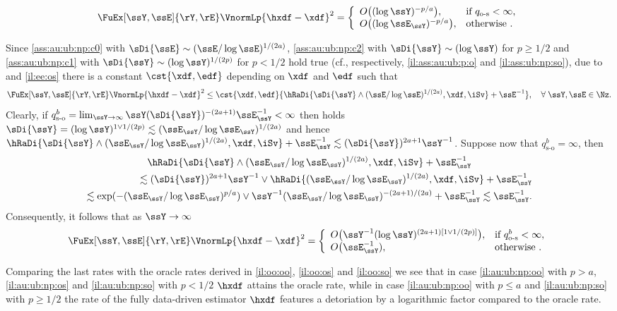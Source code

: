 \begin{il}
\begin{Liste}[]
\begin{equation*}
\FuEx[\ssY,\ssE]{\rY,\rE}\VnormLp{\hxdf-\xdf}^2=\left\{\begin{array}{ll}
O\big((\log\ssY)^{-p/a}\big),& \text{if }q_{\text{o-s}}<\infty,\\
O\big((\log \ssE_{\ssY})^{-p/a}\big),& \text{otherwise }.
\end{array}\right.
\end{equation*}
\item[\mylabel{il:au:ub:np:so}{\dg\bfseries{[s-o]}}] 
Since  \ref{ass:au:ub:np:c0} with $\sDi{\ssE}\sim
(\ssE/\log\ssE)^{1/(2a)}$, \ref{ass:au:ub:np:c2} with
$\sDi{\ssY}\sim (\log\ssY)$ for $p\geq1/2$ and \ref{ass:au:ub:np:c1} with
$\sDi{\ssY}\sim (\log\ssY)^{1/(2p)}$ for $p<1/2$  hold true
(cf., respectively,  \ref{il:ass:au:ub:p:o} and
 \ref{il:ass:ub:np:so}), 
 due to
 and  \ref{il:ee:os}
there is a constant $\cst{\xdf,\edf}$ depending on $\xdf$ and $\edf$
such that
\begin{equation}\label{il:au:ub:np:os:e3}\FuEx[\ssY,\ssE]{\rY,\rE}\VnormLp{\hxdf-\xdf}^2\leq\cst{\xdf,\edf}\{\hRaDi{\sDi{\ssY}\wedge(\ssE/\log\ssE)^{1/(2a)},\xdf,\iSv}+\ssE^{-1}\},\quad\forall\;\ssY,\ssE\in\Nz.\end{equation} 
Clearly, if
$q^b_{\text{s-o}}=\lim_{\ssY\to\infty}\ssY(\sDi{\ssY})^{-(2a+1)}\ssE_{\ssY}^{-1}<\infty$
then holds $\sDi{\ssY}=(\log\ssY)^{1\vee1/(2p)}\lesssim(\ssE_{\ssY}/\log\ssE_{\ssY})^{1/(2a)}$ and hence 
$\hRaDi{\sDi{\ssY}\wedge(\ssE_{\ssY}/\log\ssE_{\ssY})^{1/(2a)},\xdf,\iSv}+\ssE_{\ssY}^{-1}\lesssim(\sDi{\ssY})^{2a+1}\ssY^{-1}$. Suppose
now that $q^b_{\text{s-o}}=\infty$, then 
\begin{multline*}
\hRaDi{\sDi{\ssY}\wedge(\ssE_{\ssY}/\log\ssE_{\ssY})^{1/(2a)},\xdf,\iSv}+\ssE_{\ssY}^{-1}\\
\hfill\lesssim(\sDi{\ssY})^{2a+1}\ssY^{-1}\vee\hRaDi{(\ssE_{\ssY}/\log\ssE_{\ssY})^{1/(2a)},\xdf,\iSv}+\ssE_{\ssY}^{-1}\\
\lesssim\exp(-(\ssE_{\ssY}/\log\ssE_{\ssY})^{p/a})\vee\ssY^{-1}(\ssE_{\ssY}/\log\ssE_{\ssY})^{-(2a+1)/(2a)}+\ssE_{\ssY}^{-1}\lesssim \ssE_{\ssY}^{-1}.
\end{multline*}
Consequently, 
it follows that as
 $\ssY\to\infty$
\begin{equation*}
\FuEx[\ssY,\ssE]{\rY,\rE}\VnormLp{\hxdf-\xdf}^2=\left\{\begin{array}{ll}
O\big(\ssY^{-1}(\log\ssY)^{(2a+1)[1\vee1/(2p)]}\big),& \text{if }q^b_{\text{o-s}}<\infty,\\
O\big(\ssE_{\ssY}^{-1}),& \text{otherwise }.
\end{array}\right.
\end{equation*}
  \end{Liste}
Comparing the last rates with the oracle rates derived in
  \ref{il:oo:oo}, \ref{il:oo:os} and \ref{il:oo:so} we see
 that in case \ref{il:au:ub:np:oo} with $p>a$, \ref{il:au:ub:np:os} and
 \ref{il:au:ub:np:so} with $p<1/2$ $\hxdf$ attains
 the oracle rate, while in case \ref{il:au:ub:np:oo} with $p\leq a$
 and  \ref{il:au:ub:np:so} with $p\geq1/2$ the rate of the fully data-driven estimator $\hxdf$ features a detoriation  by a logarithmic factor compared to the
 oracle rate.
\end{il}